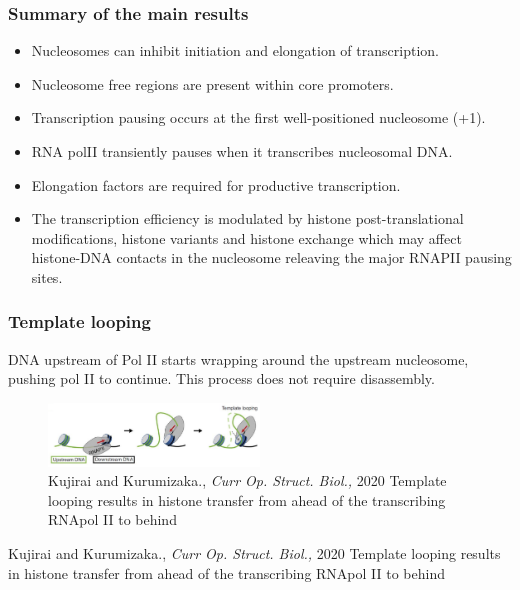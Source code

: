 \hypertarget{summary-of-the-main-results}{%
\subsubsection{Summary of the main results}\label{summary-of-the-main-results}}

\begin{itemize}
\tightlist
\item
  Nucleosomes can inhibit initiation and elongation of transcription.
\item
  Nucleosome free regions are present within core promoters.
\item
  Transcription pausing occurs at the first well-positioned nucleosome (+1).
\item
  RNA polII transiently pauses when it transcribes nucleosomal DNA.
\item
  Elongation factors are required for productive transcription.
\item
  The transcription efficiency is modulated by histone post-translational modifications, histone variants and histone exchange which may affect histone-DNA contacts in the nucleosome releaving the major RNAPII pausing sites.
\end{itemize}

\hypertarget{template-looping}{%
\subsubsection{Template looping}\label{template-looping}}

DNA upstream of Pol II starts wrapping around the upstream nucleosome, pushing pol II to continue. This process does not require disassembly.

\begin{figure}
\centering
\includegraphics[width=0.5\textwidth]{../_resources/Screenshot_2022-10-05_at_23-04-42.png}
\caption{Kujirai and Kurumizaka., \emph{Curr Op. Struct. Biol.,} 2020
Template looping results in histone transfer from ahead of the transcribing RNApol II to behind}
\end{figure}

Kujirai and Kurumizaka., \emph{Curr Op. Struct. Biol.,} 2020
Template looping results in histone transfer from ahead of the transcribing RNApol II to behind

